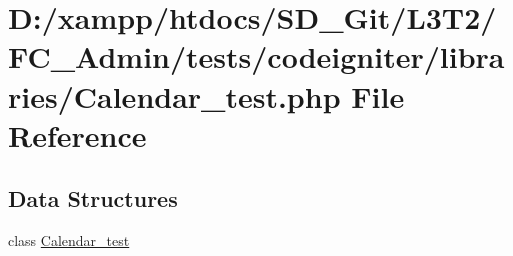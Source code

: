 \hypertarget{_calendar__test_8php}{}\section{D\+:/xampp/htdocs/\+S\+D\+\_\+\+Git/\+L3\+T2/\+F\+C\+\_\+\+Admin/tests/codeigniter/libraries/\+Calendar\+\_\+test.php File Reference}
\label{_calendar__test_8php}
\subsection*{Data Structures}
\begin{DoxyCompactItemize}
\item 
class \hyperlink{class_calendar__test}{Calendar\+\_\+test}
\end{DoxyCompactItemize}
